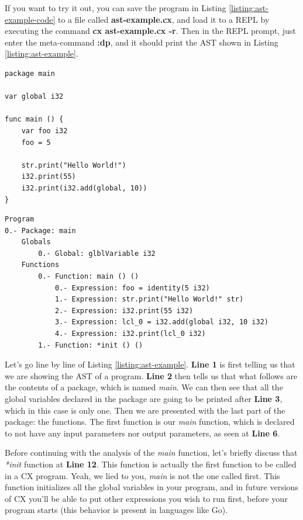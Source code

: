 \documentclass[11pt,fleqn,openany]{book} %
\begin{document}
If you want to try it out, you can save the program in Listing \ref{listing:ast-example-code} to a file called \textbf{ast-example.cx}, and load it to a REPL by executing the command \textbf{cx ast-example.cx -r}. Then in the REPL prompt, just enter the meta-command \textbf{:dp}, and it should print the AST shown in Listing \ref{listing:ast-example}.
        
\begin{lstlisting}[caption={Abstract Syntax Tree Example - Code},captionpos=b,label={listing:ast-example-code}]
package main

var global i32

func main () {
	var foo i32
	foo = 5
	
 	str.print("Hello World!")
	i32.print(55)
	i32.print(i32.add(global, 10))
}
\end{lstlisting}

\begin{lstlisting}[caption={Abstract Syntax Tree Example},captionpos=b,label={listing:ast-example}]
Program
0.- Package: main
	Globals
		0.- Global: glblVariable i32
	Functions
		0.- Function: main () ()
			0.- Expression: foo = identity(5 i32)
			1.- Expression: str.print("Hello World!" str)
			2.- Expression: i32.print(55 i32)
			3.- Expression: lcl_0 = i32.add(global i32, 10 i32)
			4.- Expression: i32.print(lcl_0 i32)
		1.- Function: *init () ()
\end{lstlisting}

Let's go line by line of Listing \ref{listing:ast-example}. \textbf{Line 1} is first telling us that we are showing the AST of a program. \textbf{Line 2} then tells us that what follows are the contents of a package, which is named \textit{main}. We can then see that all the global variables declared in the package are going to be printed after \textbf{Line 3}, which in this case is only one. Then we are presented with the last part of the package: the functions. The first function is our \textit{main} function, which is declared to not have any input parameters nor output parameters, as seen at \textbf{Line 6}.

Before continuing with the analysis of the \textit{main} function, let's briefly discuss that \textit{*init} function at \textbf{Line 12}. This function is actually the first function to be called in a CX program. Yeah, we lied to you, \textit{main} is not the one called first. This function initializes all the global variables in your program, and in future versions of CX you'll be able to put other expressions you wish to run first, before your program starts (this behavior is present in languages like Go).
\end{document}
